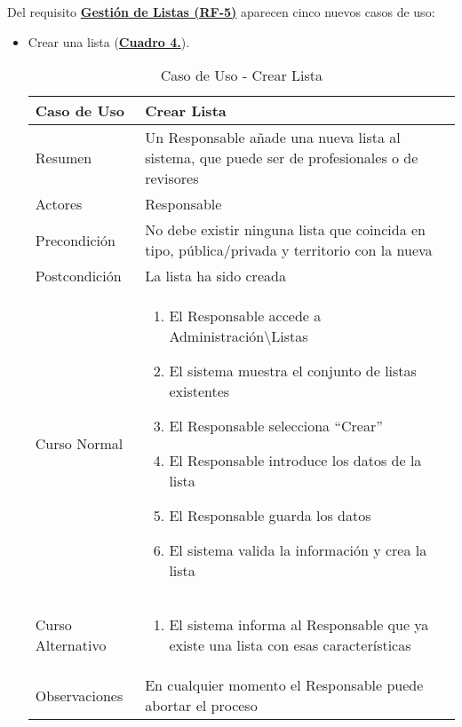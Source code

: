 \pagebreak
Del requisito \textbf{\hyperref[tab:rfGestLst]{Gestión de Listas (RF-5)}} aparecen cinco nuevos casos de uso:
\begin{itemize}
	\item \addtocounter{tabla}{1} Crear una lista (\textbf{\hyperref[tab:curCrearLista]{Cuadro 4.}}).
		\begin{table}[!htbp]
		  \centering  \addtocounter{casouso}{1}
		  \begin{tabular}{|l | p{100mm}|}
		    \textbf{Caso de Uso}  & \textbf{Crear Lista} \\ \hline
		    Resumen 		 & Un Responsable añade una nueva lista al sistema, que puede ser de profesionales o de revisores \\ \hline
		    Actores  		 & Responsable \\ \hline
		    Precondición  	 & No debe existir ninguna lista que coincida en tipo, pública/privada y territorio con la nueva  \\ \hline
		    Postcondición  	 & La lista ha sido creada \\ \hline
		    Curso Normal   	 & \begin{enumerate}
			  \item El Responsable accede a Administración\textbackslash Listas
			  \item El sistema muestra el conjunto de listas existentes
			  \item El Responsable selecciona ``Crear''
			  \item El Responsable introduce los datos de la lista
			  \item El Responsable guarda los datos
			  \item El sistema valida la información y crea la lista
		    \end{enumerate}  \\ \hline
		    Curso Alternativo  & \begin{enumerate}
			  \item El sistema informa al Responsable que ya existe una lista con esas características
		    \end{enumerate}  \\ \hline
		    Observaciones 	 & En cualquier momento el Responsable puede abortar el proceso  \\ \hline
		  \end{tabular}
		  \caption{Caso de Uso  - Crear Lista}
		  \label{tab:curCrearLista}
		\end{table}
		\FloatBarrier
	

\end{itemize}
